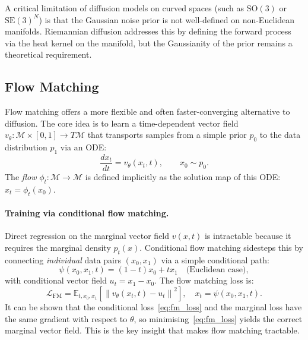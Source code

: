 \documentclass[12pt,a4paper]{article}
\newcommand{\SE}{\mathrm{SE}(3)}
\newcommand{\SOthree}{\mathrm{SO}(3)}
\newcommand{\Loss}{\mathcal{L}}
\newcommand{\norm}[1]{\left\|#1\right\|}
\begin{document}
A critical limitation of diffusion models on curved spaces (such as $\SOthree$ or $\SE^N$) is
that the Gaussian noise prior is not well-defined on non-Euclidean manifolds.  Riemannian
diffusion \citep{yim2023framediff} addresses this by defining the forward process via the
heat kernel on the manifold, but the Gaussianity of the prior remains a theoretical requirement.

\subsection{Flow Matching}
\label{sec:flow_matching}

Flow matching \citep{lipman2023,chen2024} offers a more flexible and often faster-converging
alternative to diffusion.  The core idea is to learn a time-dependent vector field
$v_\theta: \mathcal{M} \times [0,1] \to T\mathcal{M}$ that transports samples from a simple
prior $p_0$ to the data distribution $p_1$ via an ODE:
\begin{equation}
  \label{eq:flow_ode}
  \frac{dx_t}{dt} = v_\theta(x_t, t), \qquad x_0 \sim p_0.
\end{equation}
The \emph{flow} $\phi_t: \mathcal{M} \to \mathcal{M}$ is defined implicitly as the solution map
of this ODE: $x_t = \phi_t(x_0)$.

\paragraph{Training via conditional flow matching.}
Direct regression on the marginal vector field $v(x,t)$ is intractable because it requires
the marginal density $p_t(x)$.  Conditional flow matching sidesteps this by connecting
\emph{individual} data pairs $(x_0, x_1)$ via a simple conditional path:
\begin{equation}
  \psi(x_0, x_1, t) = (1-t) x_0 + t x_1 \quad \text{(Euclidean case)},
\end{equation}
with conditional vector field $u_t = x_1 - x_0$.  The flow matching loss is:
\begin{equation}
  \label{eq:fm_loss}
  \Loss_{\mathrm{FM}} = \mathbb{E}_{t, x_0, x_1}\!\left[\norm{v_\theta(x_t, t) - u_t}^2\right],
  \quad x_t = \psi(x_0, x_1, t).
\end{equation}
It can be shown \citep{lipman2023} that the conditional loss~\eqref{eq:fm_loss} and the
marginal loss have the same gradient with respect to $\theta$, so minimising~\eqref{eq:fm_loss}
yields the correct marginal vector field.  This is the key insight that makes flow matching
tractable.
\end{document}

